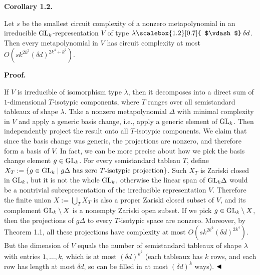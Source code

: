 \par\medskip\noindent\textbf{Corollary 1.2.}\par



Let $s$ be the smallest circuit complexity of a nonzero metapolynomial in an irreducible $\textnormal{GL}_{k}$-representation $V$ of type $\lambda\mathchoice{\scalebox{1.2}[0.7]{ $\vdash$}\,}{\scalebox{1.2}[0.7]{ $\vdash$}\,}{\scalebox{0.7}{\scalebox{1.2}[0.7]{$\vdash$}}\,}{\scalebox{0.5}{\scalebox{1.2}[0.7]{$\vdash$}}\,}\delta d$.
Then every metapolynomial in $V$ has circuit complexity at most
$O(sk^{2k^{2}}(\delta d)^{2k^{4}+k^{2}})$.






\par\medskip\noindent\textbf{Proof.}\par




If $V$ is irreducible of isomorphism type $\lambda$, then it decomposes into a direct sum of $1$-dimensional $T$-isotypic components, where $T$ ranges over all semistandard tableaux of shape $\lambda$.
Take a nonzero metapolynomial $\Delta$ with minimal complexity in $V$ and apply a generic basis change, i.e., apply a generic element of $\textnormal{GL}_{k}$.
Then independently project the result onto all $T$-isotypic components.
We claim that since the basis change was generic, the projections are nonzero, and therefore form a basis of $V$.
In fact, we can be more precise about how we pick the basis change element $g\in\textnormal{GL}_{k}$.
For every semistandard tableau $T$, define $X_{T}:=\{g\in\textnormal{GL}_{k}\mid g\Delta\text{ has zero $T$-isotypic projection}\}$.
Such $X_{T}$ is Zariski closed in $\textnormal{GL}_{k}$, but it is not the whole $\textnormal{GL}_{k}$, otherwise the linear span of $\textnormal{GL}_{k}\Delta$ would be a nontrivial subrepresentation of the irreducible representation $V$.
Therefore the finite union $X:=\bigcup_{T}X_{T}$ is also a proper Zariski closed subset of $V$, and its complement $\textnormal{GL}_{k}\setminus X$ is a nonempty Zariski open subset.
If we pick $g\in\textnormal{GL}_{k}\setminus X$, then the projections of $g\Delta$ to every $T$-isotypic space are nonzero.
Moreover, by Theorem 1.1, all these projections have complexity at most $O(sk^{2k^{2}}(\delta d)^{2k^{4}})$.
But the dimension of $V$ equals the number of semistandard tableaux of shape $\lambda$ with entries $1,\ldots,k$, which is at most $(\delta d)^{k^{2}}$ (each tableaux has $k$ rows, and each row has length at most $\delta d$, so can be filled in at most $(\delta d)^{k}$ ways).
$\hfill\blacktriangleleft$





